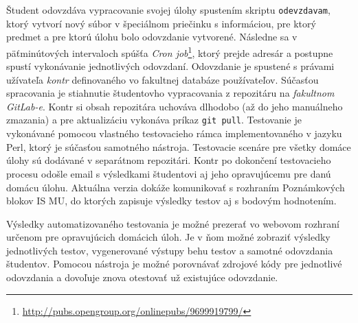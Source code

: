 \documentclass[
  digital, %
  twoside, %
  table,   %
  lof,     %
  lot,     %
]{fithesis3}
\begin{document}
Študent odovzdáva vypracovanie svojej úlohy spustením skriptu \texttt{odevzdavam}, ktorý vytvorí nový súbor v špeciálnom priečinku s informáciou, pre ktorý predmet a pre ktorú úlohu bolo odovzdanie vytvorené. Následne sa v päťminútových intervaloch spúšťa \textit{Cron job}\footnote{\url{http://pubs.opengroup.org/onlinepubs/9699919799/}}, ktorý prejde adresár a postupne spustí vykonávanie jednotlivých odovzdaní. Odovzdanie je spustené s právami užívateľa \emph{kontr} definovaného vo fakultnej databáze používateľov. Súčasťou spracovania je stiahnutie študentovho vypracovania z repozitáru na \emph{fakultnom GitLab-e}. Kontr si obsah repozitára uchováva dlhodobo (až do jeho manuálneho zmazania) a pre aktualizáciu vykonáva príkaz \texttt{git pull}. Testovanie je vykonávané pomocou vlastného testovacieho rámca implementovaného v jazyku Perl, ktorý je súčasťou samotného nástroja. Testovacie scenáre pre všetky domáce úlohy sú dodávané v separátnom repozitári. Kontr po dokončení testovacieho procesu odošle email s výsledkami študentovi aj jeho opravujúcemu pre danú domácu úlohu. Aktuálna verzia dokáže komunikovať s rozhraním Poznámkových blokov IS MU, do ktorých zapisuje výsledky testov aj s bodovým hodnotením.

Výsledky automatizovaného testovania je možné prezerať vo webovom rozhraní určenom pre opravujúcich domácich úloh. Je v ňom možné zobraziť výsledky jednotlivých testov, vygenerované výstupy behu testov a samotné odovzdania študentov. Pomocou nástroja je možné porovnávať zdrojové kódy pre jednotlivé odovzdania a dovoľuje znova otestovať už existujúce odovzdanie. 
\end{document}
